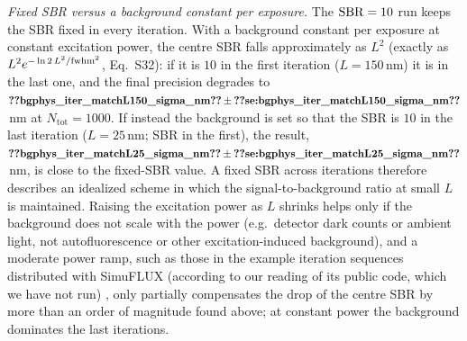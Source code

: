 \emph{Fixed SBR versus a background constant per exposure.} The $\mathrm{SBR}=10$ run keeps the SBR
fixed in every iteration. With a background constant per exposure at constant excitation power,
the centre SBR falls approximately as $L^2$ (exactly as $L^2e^{-\ln2\,L^2/\mathrm{fwhm}^2}$, Eq.~S32): if it is $10$ in the first iteration ($L=150$\,nm) it is
 in the last one, and
the final precision degrades to
$\pnum{bgphys_iter_matchL150_sigma_nm}\pm\pnumse{bgphys_iter_matchL150_sigma_nm}$\,nm
at $N_{\mathrm{tot}}=1000$. If instead the background is set so that the SBR is $10$ in the
last iteration ($L=25$\,nm; SBR 
in the first), the result,
$\pnum{bgphys_iter_matchL25_sigma_nm}\pm\pnumse{bgphys_iter_matchL25_sigma_nm}$\,nm,
is close to the fixed-SBR value. A fixed SBR across iterations therefore describes an idealized
scheme in which the signal-to-background ratio at small $L$ is maintained. Raising the
excitation power as $L$ shrinks helps only if the background does not scale with the power
(e.g.\ detector dark counts or ambient light, not autofluorescence or other excitation-induced
background), and a moderate power ramp, such as those in the example iteration sequences
distributed with SimuFLUX (according to our reading of its public code, which we have not run)
\cite{MarinRies2026}, only partially compensates the drop of the centre SBR by more than an
order of magnitude found above; at constant power the background dominates the last iterations.

